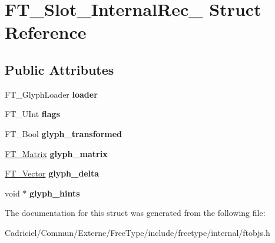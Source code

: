 \hypertarget{struct_f_t___slot___internal_rec__}{}\section{F\+T\+\_\+\+Slot\+\_\+\+Internal\+Rec\+\_\+ Struct Reference}
\label{struct_f_t___slot___internal_rec__}
\subsection*{Public Attributes}
\begin{DoxyCompactItemize}
\item 
F\+T\+\_\+\+Glyph\+Loader {\bfseries loader}\hypertarget{struct_f_t___slot___internal_rec___ac57f8c939f667938ab9f986088c15d8f}{}\label{struct_f_t___slot___internal_rec___ac57f8c939f667938ab9f986088c15d8f}

\item 
F\+T\+\_\+\+U\+Int {\bfseries flags}\hypertarget{struct_f_t___slot___internal_rec___a9a2a287ba2b363197b36fe24d2f48746}{}\label{struct_f_t___slot___internal_rec___a9a2a287ba2b363197b36fe24d2f48746}

\item 
F\+T\+\_\+\+Bool {\bfseries glyph\+\_\+transformed}\hypertarget{struct_f_t___slot___internal_rec___ac2bba891ac70016b74c085a05c1f182c}{}\label{struct_f_t___slot___internal_rec___ac2bba891ac70016b74c085a05c1f182c}

\item 
\hyperlink{struct_f_t___matrix__}{F\+T\+\_\+\+Matrix} {\bfseries glyph\+\_\+matrix}\hypertarget{struct_f_t___slot___internal_rec___a95af217daf1c2080692b5a69e345aa3b}{}\label{struct_f_t___slot___internal_rec___a95af217daf1c2080692b5a69e345aa3b}

\item 
\hyperlink{struct_f_t___vector__}{F\+T\+\_\+\+Vector} {\bfseries glyph\+\_\+delta}\hypertarget{struct_f_t___slot___internal_rec___a2a94b955dd1e260aaf8699238d44769d}{}\label{struct_f_t___slot___internal_rec___a2a94b955dd1e260aaf8699238d44769d}

\item 
void $\ast$ {\bfseries glyph\+\_\+hints}\hypertarget{struct_f_t___slot___internal_rec___a16337853823cdccfb0c636673c4eb3ae}{}\label{struct_f_t___slot___internal_rec___a16337853823cdccfb0c636673c4eb3ae}

\end{DoxyCompactItemize}


The documentation for this struct was generated from the following file\+:\begin{DoxyCompactItemize}
\item 
Cadriciel/\+Commun/\+Externe/\+Free\+Type/include/freetype/internal/ftobjs.\+h\end{DoxyCompactItemize}
